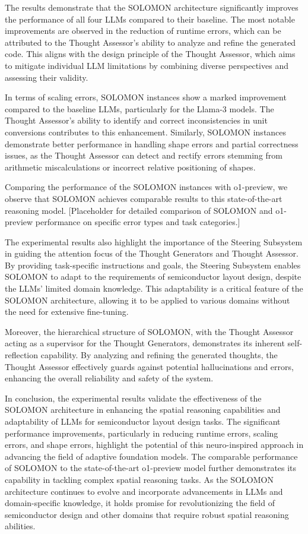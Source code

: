 \documentclass{article}
\begin{document}
The results demonstrate that the SOLOMON architecture significantly improves the performance of all four LLMs compared to their baseline. The most notable improvements are observed in the reduction of runtime errors, which can be attributed to the Thought Assessor's ability to analyze and refine the generated code. This aligns with the design principle of the Thought Assessor, which aims to mitigate individual LLM limitations by combining diverse perspectives and assessing their validity.

In terms of scaling errors, SOLOMON instances show a marked improvement compared to the baseline LLMs, particularly for the Llama-3 models. The Thought Assessor's ability to identify and correct inconsistencies in unit conversions contributes to this enhancement. Similarly, SOLOMON instances demonstrate better performance in handling shape errors and partial correctness issues, as the Thought Assessor can detect and rectify errors stemming from arithmetic miscalculations or incorrect relative positioning of shapes.

Comparing the performance of the SOLOMON instances with o1-preview, we observe that SOLOMON achieves comparable results to this state-of-the-art reasoning model. [Placeholder for detailed comparison of SOLOMON and o1-preview performance on specific error types and task categories.]

The experimental results also highlight the importance of the Steering Subsystem in guiding the attention focus of the Thought Generators and Thought Assessor. By providing task-specific instructions and goals, the Steering Subsystem enables SOLOMON to adapt to the requirements of semiconductor layout design, despite the LLMs' limited domain knowledge. This adaptability is a critical feature of the SOLOMON architecture, allowing it to be applied to various domains without the need for extensive fine-tuning.

Moreover, the hierarchical structure of SOLOMON, with the Thought Assessor acting as a supervisor for the Thought Generators, demonstrates its inherent self-reflection capability. By analyzing and refining the generated thoughts, the Thought Assessor effectively guards against potential hallucinations and errors, enhancing the overall reliability and safety of the system.

In conclusion, the experimental results validate the effectiveness of the SOLOMON architecture in enhancing the spatial reasoning capabilities and adaptability of LLMs for semiconductor layout design tasks. The significant performance improvements, particularly in reducing runtime errors, scaling errors, and shape errors, highlight the potential of this neuro-inspired approach in advancing the field of adaptive foundation models. The comparable performance of SOLOMON to the state-of-the-art o1-preview model further demonstrates its capability in tackling complex spatial reasoning tasks. As the SOLOMON architecture continues to evolve and incorporate advancements in LLMs and domain-specific knowledge, it holds promise for revolutionizing the field of semiconductor design and other domains that require robust spatial reasoning abilities.
\end{document}
